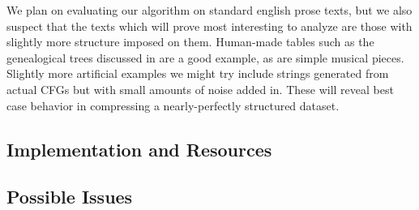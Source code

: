 \documentclass[11pt]{article}
\begin{document}
We plan on evaluating our algorithm on standard english prose texts, but we
also suspect that the texts which will prove most interesting to analyze are
those with slightly more structure imposed on them. Human-made tables such as
the genealogical trees discussed in \cite{nevillphd} are a good example, as are
simple musical pieces. Slightly more artificial examples we might try include
strings generated from actual CFGs but with small amounts of noise added in.
These will reveal best case behavior in compressing a nearly-perfectly
structured dataset.

\subsection{Implementation and Resources}

\subsection{Possible Issues}

\nocite{*}


\end{document}

